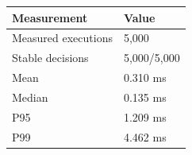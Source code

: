 \begin{tabular}{ll}
\toprule
Measurement & Value \\
\midrule
Measured executions & 5,000 \\
Stable decisions & 5,000/5,000 \\
Mean & 0.310 ms \\
Median & 0.135 ms \\
P95 & 1.209 ms \\
P99 & 4.462 ms \\
\bottomrule
\end{tabular}

